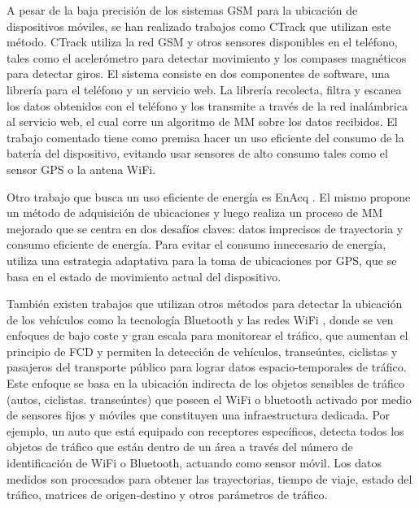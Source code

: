 A pesar de la baja precisión de los sistemas GSM para la ubicación de dispositivos móviles, se han realizado trabajos como CTrack \cite{thiagarajan2011accurate} que utilizan este método. CTrack utiliza la red GSM y  otros sensores disponibles en el teléfono, tales como el  acelerómetro para detectar movimiento y los compases magnéticos para detectar giros. El sistema consiste en dos componentes de software, una librería para el teléfono y un servicio web. La librería recolecta, filtra y escanea los datos obtenidos con el teléfono y los transmite a través de la red inalámbrica al servicio web, el cual corre un algoritmo de MM sobre los datos recibidos. El trabajo comentado tiene como premisa hacer un uso eficiente del consumo de la batería del dispositivo, evitando usar sensores de alto consumo tales como el sensor GPS o la antena WiFi.

Otro trabajo que busca un uso eficiente de energía es EnAcq \cite{fang2011enacq}. El mismo propone un método de adquisición de ubicaciones y luego realiza un proceso de MM mejorado que se centra en dos desafíos claves: datos imprecisos de trayectoria y consumo eficiente de energía. Para evitar el consumo innecesario de energía, utiliza una estrategia adaptativa para la toma de ubicaciones por GPS, que se basa en el estado de movimiento actual del dispositivo.

También existen trabajos que utilizan otros métodos para detectar la ubicación de los vehículos como la tecnología Bluetooth y las redes WiFi \cite{ruppe2012augmenting}, donde se ven enfoques de bajo coste y gran escala para monitorear el tráfico, que aumentan el principio de FCD y permiten la detección de vehículos, transeúntes, ciclistas y pasajeros del transporte público para lograr datos espacio-temporales de tráfico. Este enfoque se basa en la ubicación indirecta de los objetos sensibles de tráfico (autos, ciclistas. transeúntes) que poseen el WiFi o bluetooth activado por medio de sensores fijos y móviles que constituyen una infraestructura dedicada. Por ejemplo, un auto que está equipado con receptores específicos, detecta todos los objetos de tráfico que están dentro de un área a través del número de identificación de WiFi o Bluetooth, actuando como sensor móvil. Los datos medidos son procesados para obtener las trayectorias, tiempo de viaje, estado del tráfico, matrices de origen-destino y otros parámetros de tráfico.
